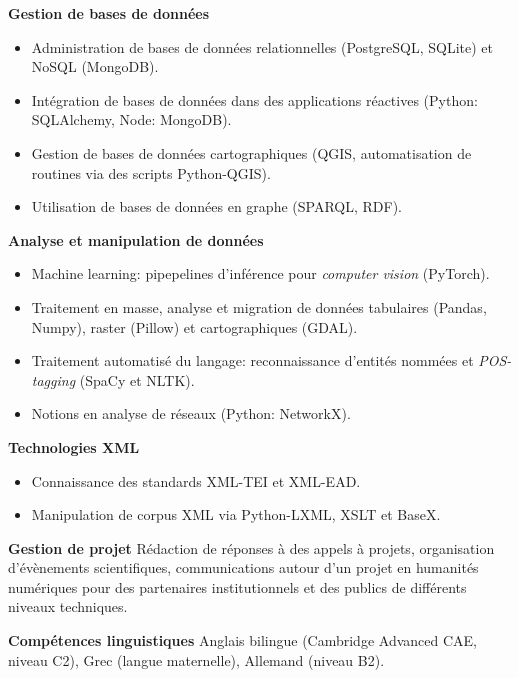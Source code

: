 \datedsubsection{ }
{}
{%
	\textbf{Gestion de bases de données}}
{%
	\begin{itemize}
		\item Administration de bases de données relationnelles (PostgreSQL, SQLite) et NoSQL (MongoDB).
		\item Intégration de bases de données dans des applications réactives (Python: SQLAlchemy, Node: MongoDB).
		\item Gestion de bases de données cartographiques (QGIS, automatisation de routines via des scripts Python-QGIS).
		\item Utilisation de bases de données en graphe (SPARQL, RDF).
	\end{itemize}
}
\datedsubsection{ }
{}
{%
	\textbf{Analyse et manipulation de données}}
{%
	\begin{itemize}
		\item Machine learning: pipepelines d'inférence pour \textit{computer vision} (PyTorch).
		\item Traitement en masse, analyse et migration de données tabulaires (Pandas, Numpy), raster (Pillow) et cartographiques (GDAL).
		\item Traitement automatisé du langage: reconnaissance d'entités nommées et \textit{POS-tagging} (SpaCy et NLTK).
		\item Notions en analyse de réseaux (Python: NetworkX).
	\end{itemize}
}
\datedsubsection{ }
{}
{%
	\textbf{Technologies XML}}
{%
	\begin{itemize}
		\item Connaissance des standards XML-TEI et XML-EAD.
		\item Manipulation de corpus XML via Python-LXML, XSLT et BaseX.
	\end{itemize}
}
\datedsubsection{ }
{}
{%
	\textbf{Gestion de projet}}
{%
	Rédaction de réponses à des appels à projets, organisation d'évènements scientifiques, communications autour d'un projet en humanités numériques pour des partenaires institutionnels et des publics de différents niveaux techniques. 
}

\datedsubsection{ }
{}
{%
	\textbf{Compétences linguistiques}}
{%
	Anglais bilingue (Cambridge Advanced CAE, niveau C2), Grec (langue maternelle), Allemand (niveau B2). }
